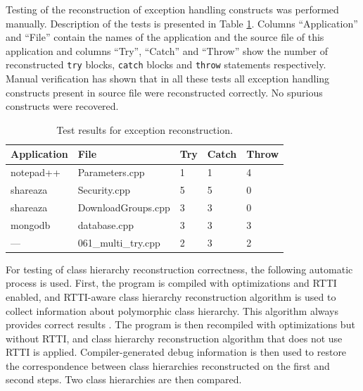 \documentclass[10pt, conference, compsocconf]{IEEEtran}
\begin{document}


Testing of the reconstruction of exception handling constructs was performed manually. 
Description of the tests is presented in Table \ref{table:samples}.
Columns ``Application'' and ``File'' contain the names of the application
and the source file of this application and columns ``Try'', ``Catch'' and ``Throw'' show 
the number of reconstructed \lstinline{try} blocks, \lstinline{catch} blocks and 
\lstinline{throw} statements respectively. 
Manual verification has shown that in all these tests all exception handling constructs 
present in source file were reconstructed correctly. No spurious constructs were recovered.



\begin{table}[b!]
\footnotesize
\begin{tabular}{|l|l|l|l|l|}
\hline
Application & File                 & Try   & Catch & Throw \\
\hline
notepad++   & Parameters.cpp       & 1     & 1     & 4     \\
shareaza    & Security.cpp         & 5     & 5     & 0     \\
shareaza    & DownloadGroups.cpp   & 3     & 3     & 0     \\
mongodb     & database.cpp         & 3     & 3     & 3     \\
---         & 061\_multi\_try.cpp  & 2     & 3     & 2     \\
\hline
\end{tabular}
\caption{Test results for exception reconstruction.}
\label{table:samples}
\end{table}

For testing of class hierarchy reconstruction correctness, the following automatic process is used.
First, the program is compiled with optimizations and RTTI enabled, and
RTTI-aware class hierarchy reconstruction algorithm is used to collect information
about polymorphic class hierarchy. This algorithm always provides correct results \cite{fokin10}.
The program is then recompiled with optimizations but without RTTI,
and class hierarchy reconstruction algorithm that does not use RTTI is applied.
Compiler-generated debug information is then used to restore the correspondence 
between class hierarchies reconstructed on the first and second steps. 
Two class hierarchies are then compared.
\end{document}
